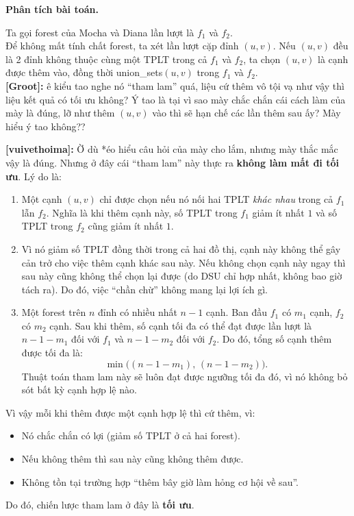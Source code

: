 \textbf{Phân tích bài toán.}

Ta gọi forest của Mocha và Diana lần lượt là $f_1$ và $f_2$.\\

Để không mất tính chất forest, ta xét lần lượt cặp đỉnh $(u, v)$. Nếu $(u, v)$ đều là 2 đỉnh không thuộc cùng một TPLT trong cả $f_1$ và $f_2$, ta chọn $(u, v)$ là cạnh được thêm vào, đồng thời union\_sets$(u, v)$ trong $f_1$ và $f_2$.\\

\textbf{[Groot]:} ê kiểu tao nghe nó ``tham lam'' quá, liệu cứ thêm vô tội vạ như vậy thì liệu kết quả có tối ưu không? Ý tao là tại vì sao mày chắc chắn cái cách làm của mày là đúng, lỡ như thêm $(u,v)$ vào thì sẽ hạn chế các lần thêm sau ấy? Mày hiểu ý tao không??

\textbf{[vuivethoima]:} Ờ dù *éo hiểu câu hỏi của mày cho lắm, nhưng mày thắc mắc vậy là đúng. Nhưng ở đây cái ``tham lam'' này thực ra \textbf{không làm mất đi tối ưu}. Lý do là:

\begin{enumerate}
    \item Một cạnh $(u,v)$ chỉ được chọn nếu nó nối hai TPLT \emph{khác nhau} trong cả $f_1$ lẫn $f_2$.  
    Nghĩa là khi thêm cạnh này, số TPLT trong $f_1$ giảm ít nhất $1$ và số TPLT trong $f_2$ cũng giảm ít nhất $1$.

    \item Vì nó giảm số TPLT đồng thời trong cả hai đồ thị, cạnh này không thể gây cản trở cho việc thêm cạnh khác sau này.  
    Nếu không chọn cạnh này ngay thì sau này cũng không thể chọn lại được (do DSU chỉ hợp nhất, không bao giờ tách ra).  
    Do đó, việc ``chần chừ'' không mang lại lợi ích gì.

    \item Một forest trên $n$ đỉnh có nhiều nhất $n-1$ cạnh.  
    Ban đầu $f_1$ có $m_1$ cạnh, $f_2$ có $m_2$ cạnh.  
    Sau khi thêm, số cạnh tối đa có thể đạt được lần lượt là $n-1-m_1$ đối với $f_1$ và $n-1-m_2$ đối với $f_2$.  
    Do đó, tổng số cạnh thêm được tối đa là:
    \[
        \min\bigl((n-1-m_1),\,(n-1-m_2)\bigr).
    \]
    Thuật toán tham lam này sẽ luôn đạt được ngưỡng tối đa đó, vì nó không bỏ sót bất kỳ cạnh hợp lệ nào.
\end{enumerate}

\noindent
Vì vậy mỗi khi thêm được một cạnh hợp lệ thì cứ thêm, vì:
\begin{itemize}
    \item Nó chắc chắn có lợi (giảm số TPLT ở cả hai forest).
    \item Nếu không thêm thì sau này cũng không thêm được.
    \item Không tồn tại trường hợp ``thêm bây giờ làm hỏng cơ hội về sau''.
\end{itemize}

Do đó, chiến lược tham lam ở đây là \textbf{tối ưu}. 
 